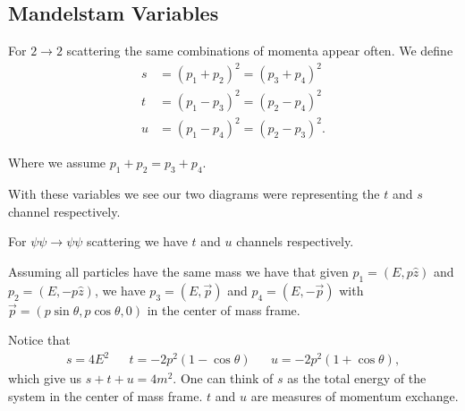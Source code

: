 \subsection{Mandelstam Variables}

For $2 \to 2$ scattering the same combinations of momenta appear often. We define
\begin{align}
    s &= \left( p_1 + p_2 \right)^2 = \left( p_3 + p_4 \right)^2 \\
    t &= \left( p_1 - p_3 \right)^2 = \left( p_2 - p_4 \right)^2 \\
    u &= \left( p_1 - p_4 \right)^2 = \left( p_2 - p_3 \right)^2
.\end{align}

Where we assume $p_1 + p_2 = p_3 + p_4$.

With these variables we see our two diagrams were representing the $t$ and $s$ channel respectively.

For $\psi \psi \to \psi \psi$ scattering we have $t$ and $u$ channels respectively.

Assuming all particles have the same mass we have that given $p_1 = \left( E, p\hat{z} \right) $ and $p_2 = \left( E, - p \hat{z} \right) $, we have $p_3 = \left( E, \vec{p} \right) $ and $p_4 = \left( E, - \vec{p} \right) $ with $\vec{p} = \left( p \sin \theta, p \cos \theta, 0 \right) $ in the center of mass frame.

Notice that
\begin{align}
    s = 4E^2  &&
    t = -2p^2 \left( 1 - \cos \theta \right)  &&
    u = -2p^2 \left( 1 + \cos \theta \right) 
,\end{align}
which give us $s + t + u = 4m^2$. One can think of $s$ as the total energy of the system in the center of mass frame. $t$ and $u$ are measures of momentum exchange.





